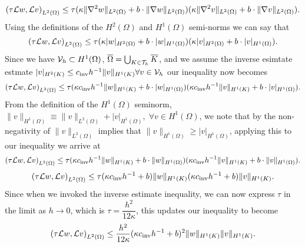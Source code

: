 \documentclass{article}
\begin{document}
\begin{itemize}
	\begin{equation*}
		\left(\tau\mathcal{L} w, \mathcal{L} v \right)_{L^2(\Omega)} \leq \tau(\kappa\|\nabla^2 w\|_{L^2(\Omega)} + b\cdot\|\nabla w\|_{L^2(\Omega)})(\kappa\|\nabla^2 v\|_{L^2(\Omega)} + b\cdot\|\nabla v\|_{L^2(\Omega)}).
	\end{equation*}
	Using the definitions of the \(H^2(\Omega) \) and \(H^1(\Omega) \) semi-norms we can say that
	\begin{equation*}
		\left(\tau\mathcal{L} w, \mathcal{L} v \right)_{L^2(\Omega)} \leq \tau(\kappa|w|_{H^2(\Omega)} + b\cdot| w|_{H^1(\Omega)})(\kappa|v|_{H^2(\Omega)} + b\cdot|v|_{H^1(\Omega)}).
	\end{equation*}
	Since we have \(\mathcal{V}_h \subset H^1(\Omega) \), \(\overline{\Omega} = \bigcup_{K\in\mathcal{T}_h}\overline{K}\), and we assume the inverse esimtate estmate \(|v|_{H^2(K)} \leq c_\text{inv}h^{-1}\|v\|_{H^1(K)} \forall v \in \mathcal{V}_h \) our inequality now becomes
	\begin{equation*}
		\left(\tau\mathcal{L} w, \mathcal{L} v \right)_{L^2(\Omega)} \leq \tau(\kappa c_\text{inv}h^{-1}\|w\|_{H^1(K)} + b\cdot| w|_{H^1(\Omega)})(\kappa c_\text{inv}h^{-1}\|v\|_{H^1(K)} + b\cdot|v|_{H^1(\Omega)}).
	\end{equation*}
	From the definition of the \(H^1(\Omega) \) seminorm, \(\|v\|_{H^1(\Omega)} \equiv \|v\|_{L^2(\Omega)} + |v|_{H^1(\Omega)}, \; \forall v \in H^1(\Omega) \), we note that by the non-negativity of \(\|v\|_{L^2(\Omega)} \) implies that \(\|v\|_{H^1(\Omega)} \geq |v|_{H^1(\Omega)} \), applying this to our inequality we arrive at
	\begin{equation*}
		\left(\tau\mathcal{L} w, \mathcal{L} v \right)_{L^2(\Omega)} \leq \tau(\kappa c_\text{inv}h^{-1}\|w\|_{H^1(K)} + b\cdot\| w\|_{H^1(\Omega)})(\kappa c_\text{inv}h^{-1}\|v\|_{H^1(K)} + b\cdot\|v\|_{H^1(\Omega)}).
	\end{equation*}
	\begin{equation*}
		\left(\tau\mathcal{L} w, \mathcal{L} v \right)_{L^2(\Omega)} \leq \tau(\kappa c_\text{inv}h^{-1}+b)\|w\|_{H^1(K)} (\kappa c_\text{inv}h^{-1} + b)\|v\|_{H^1(K)}.
	\end{equation*}
	Since when we invoked the inverse estimate inequality, we can now express \(\tau\) in the limit as \(h \to 0 \), which is \(\tau = \dfrac{h^2}{12\kappa} \), this updates our inequality to become
	\begin{equation*}
		\left(\tau\mathcal{L} w, \mathcal{L} v \right)_{L^2(\Omega)} \leq \frac{h^2}{12\kappa}(\kappa c_\text{inv}h^{-1}+b)^2 \|w\|_{H^1(K)} \|v\|_{H^1(K)}.
	\end{equation*}

\end{itemize}
\end{document}

